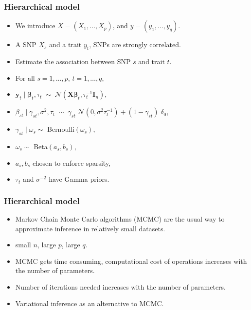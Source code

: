 \documentclass{beamer}
\begin{document}
\begin{frame}
\frametitle{Hierarchical model}
\begin{itemize}
\item We introduce $X = (X_1,\ldots,X_p)$, and $y = (y_1,\ldots,y_q)$.
\item A SNP $X_s$ and a trait $y_t$, SNPs are strongly correlated.
\item Estimate the association between SNP $s$ and trait $t$.
\item For all $s = 1,\ldots,p$, $t=1,\ldots,q$,
\item $\boldsymbol{y}_t \mid \boldsymbol{\beta}_t, \tau_t\; \sim\; \mathcal{N}(\boldsymbol{X\beta}_t,\tau_t^{-1}\boldsymbol{I}_n)$,
\item $\beta_{st}\mid\gamma_{st},\sigma^2,\tau_t\; \sim\; \gamma_{st}\;\mathcal{N}(0,\sigma^2\tau_t^{-1})+(1-\gamma_{st})\;\delta_0$,
\item $\gamma_{st} \mid \omega_{s} \sim $ Bernoulli$(\omega_s)$,
\item $\omega_s \sim $ Beta$(a_s,b_s)$,
\item $a_s, b_s$ chosen to enforce sparsity,
\item $\tau_t$ and $\sigma^{-2}$ have Gamma priors.

\end{itemize}

\end{frame}

\begin{frame}
\frametitle{Hierarchical model}
\begin{itemize}
\item Markov Chain Monte Carlo algorithms (MCMC) are the usual way to approximate inference in relatively small datasets.
\item small $n$, large $p$, large $q$.
\item MCMC gets time consuming, computational cost of operations increases with the number of parameters.
\item Number of iterations needed increases with the number of parameters.
\item Variational inference as an alternative to MCMC. 
\end{itemize}
\end{frame}
\end{document}
